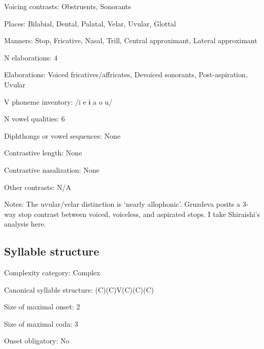 {\begin{appendixdesc}
\item[Voicing contrasts:] Obstruents, Sonorants

\item[Places:] Bilabial, Dental, Palatal, Velar, Uvular, Glottal

\item[Manners:] Stop, Fricative, Nasal, Trill, Central approximant, Lateral approximant

\item[N elaborations:] 4

\item[Elaborations:] Voiced fricatives/affricates, Devoiced sonorants, Post-aspiration, Uvular

\item[V phoneme inventory:] /i e ɨ a o u/

\item[N vowel qualities:] 6

\item[Diphthongs or vowel sequences:] None

\item[Contrastive length:] None

\item[Contrastive nasalization:] None

\item[Other contrasts:] N/A

\item[Notes:] The uvular/velar distinction is ‘nearly allophonic’. Gruzdeva posits a 3-way stop contrast between voiced, voiceless, and aspirated stops. I take Shiraishi’s analysis here.
\end{appendixdesc}
\subsection*{Syllable structure}
\begin{appendixdesc}

\item[Complexity category:] Complex

\item[Canonical syllable structure:] (C)(C)V(C)(C)(C) \citep[29--30]{Shiraishi2006}

\item[Size of maximal onset:] 2

\item[Size of maximal coda:] 3

\item[Onset obligatory:] No


\end{appendixdesc}}
